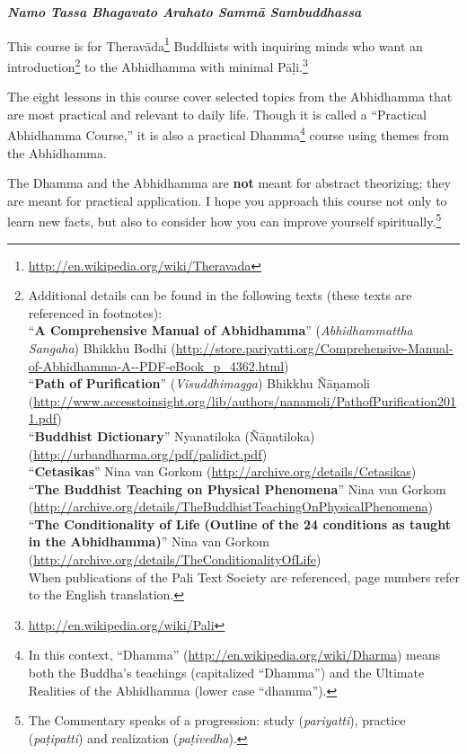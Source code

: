 \begin{center}
\textbf{\textit{Namo Tassa Bhagavato Arahato Sammā Sambuddhassa}} \\
\end{center}

This course is for Theravāda\footnote{\url{http://en.wikipedia.org/wiki/Theravada}} Buddhists with inquiring minds who want an introduction\footnote{Additional details can be found in the following texts (these texts are referenced in footnotes):\\
“\textbf{A Comprehensive Manual of Abhidhamma}” (\textit{Abhidhammattha Sangaha}) Bhikkhu Bodhi (\url{http://store.pariyatti.org/Comprehensive-Manual-of-Abhidhamma-A--PDF-eBook_p_4362.html})\\
“\textbf{Path of Purification}” (\textit{Visuddhimagga}) Bhikkhu Ñāṇamoli (\url{http://www.accesstoinsight.org/lib/authors/nanamoli/PathofPurification2011.pdf})\\
“\textbf{Buddhist Dictionary}” Nyanatiloka (Ñāṇatiloka) (\url{http://urbandharma.org/pdf/palidict.pdf})\\
“\textbf{Cetasikas}” Nina van Gorkom (\url{http://archive.org/details/Cetasikas})\\
“\textbf{The Buddhist Teaching on Physical Phenomena}” Nina van Gorkom (\url{http://archive.org/details/TheBuddhistTeachingOnPhysicalPhenomena})\\
“\textbf{The Conditionality of Life (Outline of the 24 conditions as taught in the Abhidhamma)}” Nina van Gorkom (\url{http://archive.org/details/TheConditionalityOfLife})\\
When publications of the Pali Text Society are referenced, page numbers refer to the English translation.} to the Abhidhamma with minimal Pāḷi.\footnote{\url{http://en.wikipedia.org/wiki/Pali}} 

The eight lessons in this course cover selected topics from the Abhidhamma that are most practical and relevant to daily life. Though it is called a “Practical Abhidhamma Course,” it is also a practical Dhamma\footnote{In this context, “Dhamma” (\url{http://en.wikipedia.org/wiki/Dharma}) means both the Buddha’s teachings (capitalized “Dhamma”) and the Ultimate Realities of the Abhidhamma (lower case “dhamma”).} course using themes from the Abhidhamma.

The Dhamma and the Abhidhamma are \textbf{not} meant for abstract theorizing; they are meant for practical application. I hope you approach this course not only to learn new facts, but also to consider how you can improve yourself spiritually.\footnote{The Commentary speaks of a progression: study (\textit{pariyatti}), practice (\textit{paṭipatti}) and realization (\textit{paṭivedha}).}

